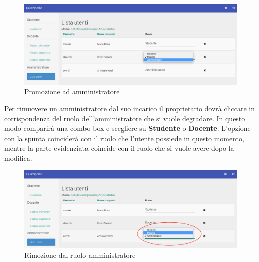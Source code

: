 \documentclass[12pt,a4paper]{article}
\begin{document}
		\begin{figure}[H]
			\centering
			\includegraphics[width=1\linewidth]{../img/screenshot/cambioRuoloDocAmm.png}
			\caption{Promozione ad amministratore}
			\label{Promozione ad amministratore}
		\end{figure}
	
	Per rimuovere un amministratore dal suo incarico il proprietario dovrà cliccare in corrispondenza del ruolo dell'amministratore che si vuole degradare. In questo modo comparirà una combo box e scegliere su \textbf{Studente} o \textbf{Docente}. L'opzione con la spunta coinciderà con il ruolo che l'utente possiede in questo momento, mentre la parte evidenziata coincide con il ruolo che si vuole avere dopo la modifica.
	
		\begin{figure}[H]
			\centering
			\includegraphics[width=1\linewidth]{../img/screenshot/cambioRuoloAmmDoc.png}
			\caption{Rimozione dal ruolo amministratore}
			\label{Rimozione dal ruolo amministratore}
		\end{figure}
	
\end{document}
